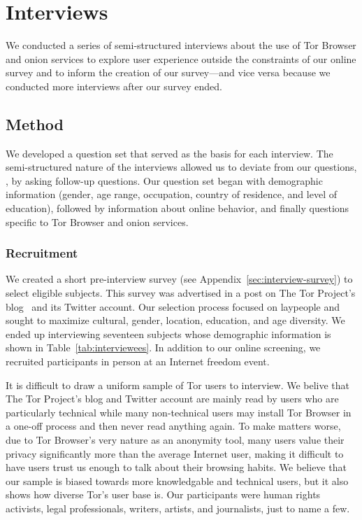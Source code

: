\section{Interviews}
\label{sec:interviews}

We conducted a series of semi-structured interviews about the use of Tor
Browser and onion services to explore user experience outside the constraints
of our online survey and to inform the creation of our survey---and vice versa
because we conducted more interviews after our survey ended.

\subsection{Method}

We developed a question set that served as the basis for each interview.  The
semi-structured nature of the interviews allowed us to deviate from our
questions, \eg, by asking follow-up questions.  Our question set began with
demographic information (gender, age range, occupation, country of residence,
and level of education), followed by information about online behavior, and
finally questions specific to Tor Browser and onion services.

\subsubsection{Recruitment}

We created a short pre-interview survey (see
Appendix~\ref{sec:interview-survey}) to select eligible subjects.  This survey
was advertised in a post on The Tor Project's blog~\cite{Winter2017a} and its
Twitter account.  Our selection process focused on laypeople and sought to
maximize cultural, gender, location, education, and age diversity.  We ended up
interviewing seventeen subjects whose demographic information is shown in
Table~\ref{tab:interviewees}.  In addition to our online screening, we
recruited participants in person at an Internet freedom event.

It is difficult to draw a uniform sample of Tor users to interview. We belive
that The Tor Project's blog and Twitter account are mainly read by users who
are particularly technical while many non-technical users may install Tor
Browser in a one-off process and then never read anything again.  To make
matters worse, due to Tor Browser's very nature as an anonymity tool, many
users value their privacy significantly more than the average Internet user,
making it difficult to have users trust us enough to talk about their browsing
habits.  We believe that our sample is biased towards more knowledgable and
technical users, but it also shows how diverse Tor's user base is.  Our
participants were human rights activists, legal professionals, writers,
artists, and journalists, just to name a few.

